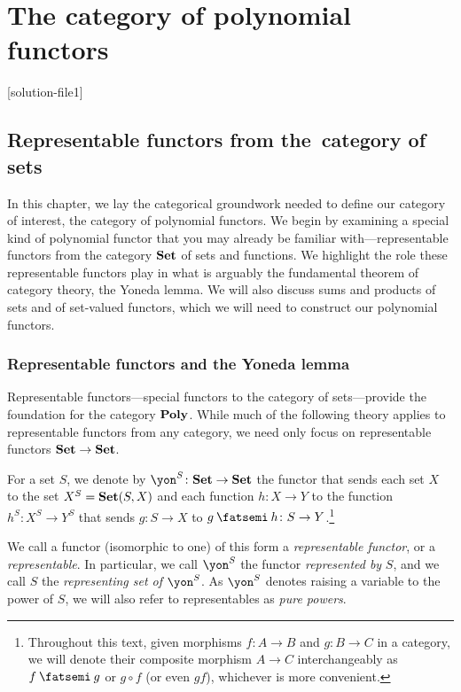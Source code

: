 \documentclass[Book-Poly]{subfiles}
\begin{document}
\setcounter{chapter}{0}%

\part{The category of polynomial functors}\label{part.poly}


[solution-file1]

\chapter{Representable functors from the~category of sets} \label{ch.poly.rep-sets}

In this chapter, we lay the categorical groundwork needed to define our category of interest, the category of polynomial functors.
We begin by examining a special kind of polynomial functor that you may already be familiar with---representable functors from the category $\mathbf{Set}$ of sets and functions.
We highlight the role these representable functors play in what is arguably the fundamental theorem of category theory, the Yoneda lemma.
We will also discuss sums and products of sets and of set-valued functors, which we will need to construct our polynomial functors.

\section{Representable functors and the Yoneda lemma} \label{sec.poly.rep-sets.yon}

Representable functors---special functors to the category of sets---provide the foundation for the category $\mathbf{Poly}$.
While much of the following theory applies to representable functors from any category, we need only focus on representable functors $\mathbf{Set}\to\mathbf{Set}$.

\begin{definition} \label{def.representable}
    For a set $S$, we denote by $\yon^S\colon\smset\to\smset$ the functor that sends each set $X$ to the set $X^S=\mathbf{Set}(S,X)$ and each function $h\colon X\to Y$ to the function $h^S\colon X^S\to Y^S$ that sends $g\colon S\to X$ to $g\then h\colon S\to Y$.\footnote{Throughout this text, given morphisms $f \colon A \to B$ and $g \colon B \to C$ in a category, we will denote their composite morphism $A \to C$ interchangeably as $f \then g$ or $g \circ f$ (or even $gf$), whichever is more convenient.}

    We call a functor (isomorphic to one) of this form a \emph{representable functor}, or a \emph{representable}.
    In particular, we call $\yon^S$ the functor \emph{represented by} $S$, and we call $S$ the \emph{representing set of $\yon^S$}.
    As $\yon^S$ denotes raising a variable to the power of $S$, we will also refer to representables as \emph{pure powers}.
\end{definition}
\end{document}
